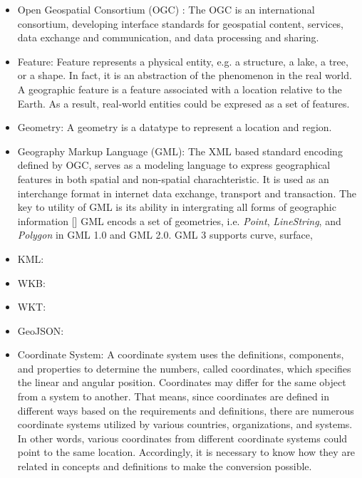 \documentclass[a4paper,12pt]{article}
\begin{document}
\begin{itemize}

\item Open Geospatial Consortium (OGC) \cite{ogc}: The OGC is an international consortium, developing interface standards for geospatial content, services, data exchange and communication, and data processing and sharing.
\item Feature: Feature represents a physical entity, e.g. a structure, a lake, a tree, or a shape. In fact, it is an abstraction of the phenomenon in the real world. A geographic feature is a feature associated with a location relative to the Earth. As a result, real-world entities could be expresed as a set of features. 
\item Geometry: A geometry is a datatype to represent a location and region. 
\item Geography Markup Language (GML): The XML based standard encoding defined by OGC, serves as a modeling language to express geographical features in both spatial and non-spatial charachteristic. It is used as an interchange format in internet data exchange, transport and transaction. The key to utility of GML is its ability in intergrating all forms of geographic information [] %
GML encods a set of geometries, i.e. \textit{Point}, \textit{LineString}, and \textit{Polygon} in GML 1.0 and GML 2.0. GML 3 supports curve, surface, 
\item KML: 
\item WKB:
\item WKT:
\item GeoJSON:
\item Coordinate System: A coordinate system uses the definitions, components, and properties to determine the numbers, called coordinates, which specifies the linear and angular position. Coordinates may differ for the same object from a system to another. That means, since coordinates are defined in different ways based on the requirements and definitions, there are numerous coordinate systems utilized by various countries, organizations, and systems. In other words, various coordinates from different coordinate systems could point to the same location. Accordingly, it is necessary to know how they are related in concepts and definitions to make the conversion possible.

\end{itemize}
\end{document}
